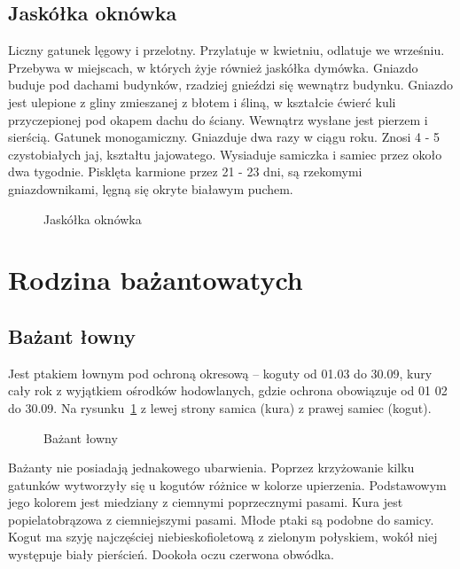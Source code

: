 \documentclass[a4paper,12pt]{article}
\begin{document}
\subsection{Jaskółka oknówka}

Liczny gatunek lęgowy i przelotny. Przylatuje w kwietniu, odlatuje we wrześniu. Przebywa w miejscach, w których żyje również jaskółka dymówka. Gniazdo buduje pod dachami budynków, rzadziej gnieździ się wewnątrz budynku. Gniazdo jest ulepione z gliny zmieszanej z błotem i śliną, w kształcie ćwierć kuli przyczepionej pod okapem dachu do ściany. Wewnątrz wysłane jest pierzem i sierścią. Gatunek monogamiczny. Gniazduje dwa razy w ciągu roku. Znosi 4 - 5 czystobiałych jaj, kształtu jajowatego. Wysiaduje samiczka i samiec przez około dwa tygodnie. Pisklęta karmione przez 21 - 23 dni, są rzekomymi gniazdownikami, lęgną się okryte białawym puchem. 

\begin{figure}
\caption{Jaskółka oknówka}
\end{figure}

\section{Rodzina bażantowatych}

\subsection{Bażant łowny}

Jest ptakiem łownym pod ochroną okresową -- koguty od 01.03 do 30.09, kury cały rok z wyjątkiem ośrodków hodowlanych, gdzie ochrona obowiązuje od 01 02 do 30.09.
Na rysunku~\ref{fig:bazant} z lewej strony samica (kura) z prawej samiec (kogut). 

\begin{figure}
\caption{Bażant łowny}
\label{fig:bazant}
\end{figure}

Bażanty nie posiadają jednakowego ubarwienia. Poprzez krzyżowanie kilku gatunków wytworzyły się u kogutów różnice w kolorze upierzenia. Podstawowym jego kolorem jest miedziany z ciemnymi poprzecznymi pasami. Kura jest popielatobrązowa z ciemniejszymi pasami. Młode ptaki są podobne do samicy. Kogut ma szyję najczęściej niebieskofioletową z zielonym połyskiem, wokół niej występuje biały pierścień. Dookoła oczu czerwona obwódka.
\end{document}
